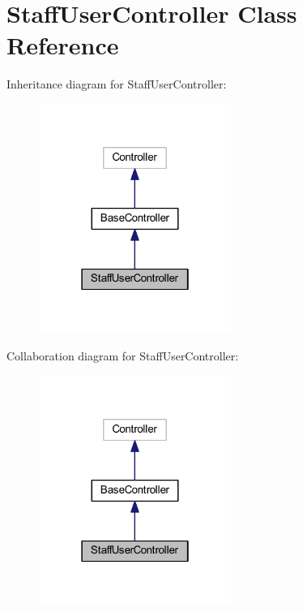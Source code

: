 \hypertarget{class_staff_user_controller}{}\section{Staff\+User\+Controller Class Reference}
\label{class_staff_user_controller}


Inheritance diagram for Staff\+User\+Controller\+:
\nopagebreak
\begin{figure}[H]
\begin{center}
\leavevmode
\includegraphics[width=178pt]{class_staff_user_controller__inherit__graph}
\end{center}
\end{figure}


Collaboration diagram for Staff\+User\+Controller\+:
\nopagebreak
\begin{figure}[H]
\begin{center}
\leavevmode
\includegraphics[width=178pt]{class_staff_user_controller__coll__graph}
\end{center}
\end{figure}
